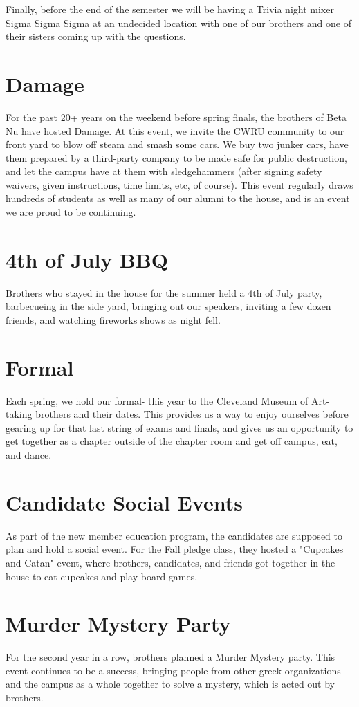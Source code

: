     Finally, before the end of the semester we will be having a Trivia night mixer 
    Sigma Sigma Sigma at an undecided location with one of our brothers and one of 
    their sisters coming up with the questions.
    
  \section*{Damage}
    For the past 20+ years on the weekend before spring finals, the brothers of
    Beta Nu have hosted Damage. At this event, we invite the CWRU community to
    our front yard to blow off steam and smash some cars. We buy two junker
    cars, have them prepared by a third-party company to be made safe for public
    destruction, and let the campus have at them with sledgehammers (after
    signing safety waivers, given instructions, time limits, etc, of course).
    This event regularly draws hundreds of students as well as many of our
    alumni to the house, and is an event we are proud to be continuing. \\
  
  \section*{4th of July BBQ}
    Brothers who stayed in the house for the summer held a 4th of July party,
    barbecueing in the side yard, bringing out our speakers, inviting a few
    dozen friends, and watching fireworks shows as night fell. \\
  
  \section*{Formal}
    Each spring, we hold our formal- this year to the Cleveland Museum of Art-
    taking brothers and their dates. This provides us a way to enjoy ourselves
    before gearing up for that last string of exams and finals, and gives us an
    opportunity to get together as a chapter outside of the chapter room and get
    off campus, eat, and dance. \\
      
  \section*{Candidate Social Events}
    As part of the new member education program, the candidates are supposed to
    plan and hold a social event. For the Fall pledge class, they hosted a
    "Cupcakes and Catan" event, where brothers, candidates, and friends got
    together in the house to eat cupcakes and play board games. \\
    
  \section*{Murder Mystery Party}
    For the second year in a row, brothers planned a Murder Mystery party. This
    event continues to be a success, bringing people from other greek
    organizations and the campus as a whole together to solve a mystery, which
    is acted out by brothers. \\

